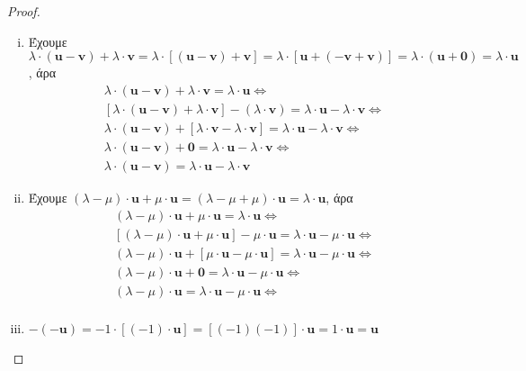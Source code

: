 \begin{proof}
\begin{enumerate}[i)]
        \item Έχουμε $ \lambda\cdot (\mathbf{u} - \mathbf{v}) + \lambda \cdot 
            \mathbf{v} = \lambda \cdot [(\mathbf{u} - \mathbf{v}) + \mathbf{v}] = 
            \lambda \cdot [\mathbf{u} + (- \mathbf{v}+ \mathbf{v})] = \lambda \cdot 
            ( \mathbf{u} + \mathbf{0}) = \lambda \cdot \mathbf{u} $, άρα 
            \begin{gather*}
                \lambda \cdot (\mathbf{u} - \mathbf{v}) + \lambda \cdot \mathbf{v} = 
                \lambda \cdot \mathbf{u} \Leftrightarrow \\ 
                [\lambda \cdot (\mathbf{u} - \mathbf{v}) + \lambda \cdot \mathbf{v}] -
                (\lambda \cdot \mathbf{v})= 
                \lambda \cdot \mathbf{u} - \lambda \cdot \mathbf{v} \Leftrightarrow \\
                \lambda \cdot (\mathbf{u} - \mathbf{v}) + 
                [\lambda \cdot \mathbf{v} - \lambda \cdot \mathbf{v}] =
                \lambda \cdot \mathbf{u} - \lambda \cdot \mathbf{v} \Leftrightarrow \\
                \lambda \cdot (\mathbf{u}- \mathbf{v}) + \mathbf{0} = \lambda \cdot 
                \mathbf{u} - \lambda \cdot \mathbf{v} \Leftrightarrow \\
                \lambda \cdot (\mathbf{u} - \mathbf{v}) = \lambda \cdot \mathbf{u} - 
                \lambda \cdot \mathbf{v}
            \end{gather*}

        \item Έχουμε $ (\lambda - \mu ) \cdot \mathbf{u} + \mu \cdot \mathbf{u} = 
            (\lambda - \mu + \mu )\cdot \mathbf{u} = \lambda \cdot \mathbf{u}$, άρα 
            \begin{gather*}
                (\lambda - \mu ) \cdot \mathbf{u} + \mu \cdot \mathbf{u} = 
                \lambda \cdot \mathbf{u} \Leftrightarrow \\
                [(\lambda - \mu )\cdot \mathbf{u} + \mu \cdot \mathbf{u}] - 
                \mu \cdot \mathbf{u} = \lambda \cdot \mathbf{u}- \mu \cdot 
                \mathbf{u} \Leftrightarrow \\
                (\lambda - \mu ) \cdot \mathbf{u} + [\mu \cdot \mathbf{u} - 
                \mu \cdot \mathbf{u}] = \lambda \cdot \mathbf{u}- \mu \cdot 
                \mathbf{u} \Leftrightarrow \\
                (\lambda - \mu )\cdot \mathbf{u} + \mathbf{0} = 
                \lambda \cdot \mathbf{u}- \mu \cdot \mathbf{u} \Leftrightarrow \\
                (\lambda - \mu )\cdot \mathbf{u} = 
                \lambda \cdot \mathbf{u}- \mu \cdot \mathbf{u} \Leftrightarrow \\
            \end{gather*}

        \item $ -(- \mathbf{u}) = -1\cdot [(-1)\cdot \mathbf{u}] = [(-1)(-1)] \cdot 
            \mathbf{u}= 1 \cdot \mathbf{u} = \mathbf{u} $
    \end{enumerate}
\end{proof}

